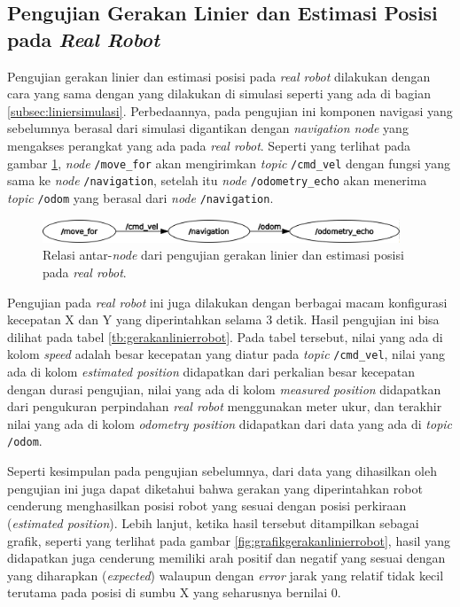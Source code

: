 \subsection{Pengujian Gerakan Linier dan Estimasi Posisi pada \emph{Real Robot}}
\label{subsec:linierrobot}

Pengujian gerakan linier dan estimasi posisi pada \emph{real robot} dilakukan dengan cara yang sama dengan yang dilakukan di simulasi seperti yang ada di bagian \ref{subsec:liniersimulasi}.
Perbedaannya, pada pengujian ini komponen navigasi yang sebelumnya berasal dari simulasi digantikan dengan \emph{navigation node} yang mengakses perangkat yang ada pada \emph{real robot}.
Seperti yang terlihat pada gambar \ref{fig:rosgraphnavigation},
  \emph{node} \lstinline{/move_for} akan mengirimkan \emph{topic} \lstinline{/cmd_vel} dengan fungsi yang sama ke \emph{node} \lstinline{/navigation},
  setelah itu \emph{node} \lstinline{/odometry_echo} akan menerima \emph{topic} \lstinline{/odom} yang berasal dari \emph{node} \lstinline{/navigation}.

\begin{figure}[ht]
  \centering
  \includegraphics[width=0.95\textwidth,keepaspectratio]{gambar/rosgraph-navigation.png}
  \caption{Relasi antar-\emph{node} dari pengujian gerakan linier dan estimasi posisi pada \emph{real robot}.}
  \label{fig:rosgraphnavigation}
\end{figure}

Pengujian pada \emph{real robot} ini juga dilakukan dengan berbagai macam konfigurasi kecepatan X dan Y yang diperintahkan selama 3 detik.
Hasil pengujian ini bisa dilihat pada tabel \ref{tb:gerakanlinierrobot}.
Pada tabel tersebut, nilai yang ada di kolom \emph{speed} adalah besar kecepatan yang diatur pada \emph{topic} \lstinline{/cmd_vel},
  nilai yang ada di kolom \emph{estimated position} didapatkan dari perkalian besar kecepatan dengan durasi pengujian,
  nilai yang ada di kolom \emph{measured position} didapatkan dari pengukuran perpindahan \emph{real robot} menggunakan meter ukur,
  dan terakhir nilai yang ada di kolom \emph{odometry position} didapatkan dari data yang ada di \emph{topic} \lstinline{/odom}.



Seperti kesimpulan pada pengujian sebelumnya,
  dari data yang dihasilkan oleh pengujian ini juga dapat diketahui bahwa gerakan yang diperintahkan robot cenderung menghasilkan posisi robot yang sesuai dengan posisi perkiraan (\emph{estimated position}).
Lebih lanjut, ketika hasil tersebut ditampilkan sebagai grafik,
  seperti yang terlihat pada gambar \ref{fig:grafikgerakanlinierrobot},
  hasil yang didapatkan juga cenderung memiliki arah positif dan negatif yang sesuai dengan yang diharapkan (\emph{expected}) walaupun dengan \emph{error} jarak yang relatif tidak kecil terutama pada posisi di sumbu X yang seharusnya bernilai 0.


